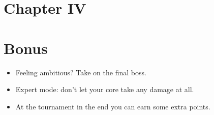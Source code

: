 \documentclass[12pt]{article}
\begin{document}
\newpage

\section*{\LARGE Chapter IV}
\section*{\LARGE Bonus}

\begin{itemize}
  \item Feeling ambitious? Take on the final boss.
  \item Expert mode: don't let your core take any damage at all.
  \item At the tournament in the end you can earn some extra points.
\end{itemize}
\end{document}
